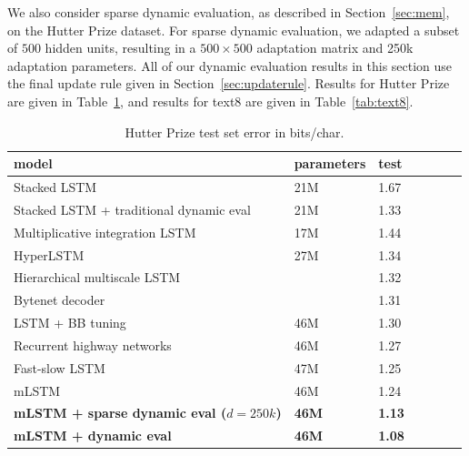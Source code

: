 \documentclass{article} %
\begin{document}
We also consider sparse dynamic evaluation, as described in Section~\ref{sec:mem}, on the Hutter Prize dataset. For sparse dynamic evaluation, we adapted a subset of $500$ hidden units, resulting in a $500\!\times\!500$ adaptation matrix and 250k adaptation parameters. All of our dynamic evaluation results in this section use the final update rule given in Section~\ref{sec:updaterule}. Results for Hutter Prize are given in Table~\ref{tab:hutter}, and results for text8 are given in Table~\ref{tab:text8}.
\begin{table}[tb]
\begin{center} 
\begin{tabular}{  l  l  l  l  l  l  l } \toprule 
model &  parameters & test \\ 
\midrule 
Stacked LSTM \citep{Graves-2013}  & 21M& 1.67 \\ 
Stacked LSTM + traditional dynamic eval \citep{Graves-2013} & 21M &1.33 \\ 
Multiplicative integration LSTM \citep{wu2016} &17M&1.44 \\  
HyperLSTM  \citep{Ha2017} & 27M&1.34\\   
Hierarchical multiscale LSTM \citep{chung2017} & & 1.32 \\  
Bytenet decoder \citep{Kalchbrenner2016}& & 1.31\\  
LSTM + BB tuning \citep{melis2017}& 46M & 1.30\\
Recurrent highway networks \citep{zilly2017} & 46M &1.27\\
Fast-slow LSTM \citep{mujika2017} & 47M & 1.25\\
\midrule 
mLSTM \citep{krause2016} & 46M & 1.24 \\
\textbf{mLSTM + sparse dynamic eval ($d=250k$)} & \textbf{46M} &\textbf{1.13}\\ 
\textbf{mLSTM + dynamic eval } & \textbf{46M} &\textbf{1.08}\\ 
\bottomrule
\end{tabular} 
\end{center}
\caption{Hutter Prize test set error in bits/char.}
\label{tab:hutter}
\end{table}
\end{document}
